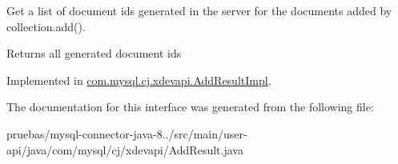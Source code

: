 Get a list of document ids generated in the server for the documents added by collection.\+add().

\begin{DoxyReturn}{Returns}
all generated document ids 
\end{DoxyReturn}


Implemented in \mbox{\hyperlink{classcom_1_1mysql_1_1cj_1_1xdevapi_1_1_add_result_impl_a61db638035bc38725440e27d51dc1ef8}{com.\+mysql.\+cj.\+xdevapi.\+Add\+Result\+Impl}}.



The documentation for this interface was generated from the following file\+:\begin{DoxyCompactItemize}
\item 
pruebas/mysql-\/connector-\/java-\/8../src/main/user-\/api/java/com/mysql/cj/xdevapi/Add\+Result.\+java\end{DoxyCompactItemize}
